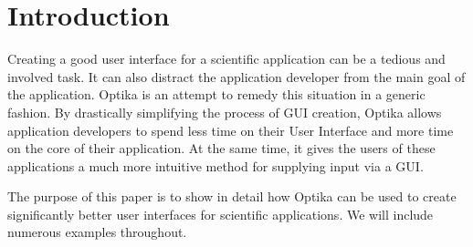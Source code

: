 \section{Introduction}
Creating a good user interface for a scientific application can be a tedious and involved task. It can also distract
the application developer from the main goal of the application.
Optika is an attempt to remedy this situation in a generic fashion. By drastically simplifying the process
of GUI creation, Optika allows application developers to spend less time on their User Interface and more time
on the core of their application. At the same time, it gives the users of these applications a much more 
intuitive method for supplying input via a GUI.

The purpose of this paper is to show in detail how Optika can be used to create
significantly better user interfaces for scientific applications. We will include
numerous examples throughout.

